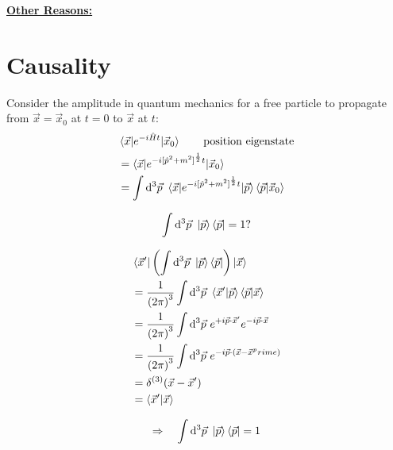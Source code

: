 \documentclass{article}
\begin{document}
\vspace{12pt}
\noindent \underline{\textbf{Other Reasons:}}

\section{Causality}

Consider the amplitude in quantum mechanics for a free particle to propagate from $ \vec{x} = \vec{x}_0 $ at $ t = 0 $ to $ \vec{x} $ at $t$:
\begin{align}
& \braket{ \vec{x} | e^{ -i \hat{H} t } | \vec{x}_0 } \qquad \mathrm{position~eigenstate} \nonumber\\
&= \braket{ \vec{x} | e^{ -i {[ \hat{p}^2 + m^2 ]}^\frac{1}{2} t } | \vec{x}_0 } \nonumber\\
&= \int \mathrm{d}^3 \vec{p} ~ \braket{ \vec{x} | e^{ -i {[ \hat{p}^2 + m^2 ]}^\frac{1}{2} t } | \vec{p} } \braket{ \vec{p} | \vec{x}_0 }
\end{align}


\begin{equation*}
\int \mathrm{d}^3 \vec{p} ~ \ket{\vec{p}} \bra{\vec{p}} = 1 ?
\end{equation*}

\begin{align}
& \braket{ \vec{x}^\prime | \left( \int \mathrm{d}^3 \vec{p} ~ \ket{\vec{p}} \bra{\vec{p}} \right) | \vec{x} } \nonumber\\
&= \frac{1}{{(2 \pi)}^3} \int \mathrm{d}^3 \vec{p} ~ \braket{ \vec{x}^\prime | \vec{p} } \braket{ \vec{p} | \vec{x} } \nonumber\\
&= \frac{1}{{(2 \pi)}^3} \int \mathrm{d}^3 \vec{p} ~ e^{ +i \vec{p} \cdot \vec{x}^\prime } e^{ -i \vec{p} \cdot \vec{x} } \nonumber\\
&= \frac{1}{{(2 \pi)}^3} \int \mathrm{d}^3 \vec{p} ~ e^{ -i \vec{p} \cdot ( \vec{x} - \vec{x}^prime ) } \nonumber\\
&= \delta^{(3)} ( \vec{x} - \vec{x}^\prime ) \nonumber\\
&= \braket{ \vec{x}^\prime | \vec{x} }
\end{align}

\begin{equation*}
\Rightarrow \quad \int \mathrm{d}^3 \vec{p} ~ \ket{\vec{p}} \bra{\vec{p}} = 1
\end{equation*}

\end{document}
